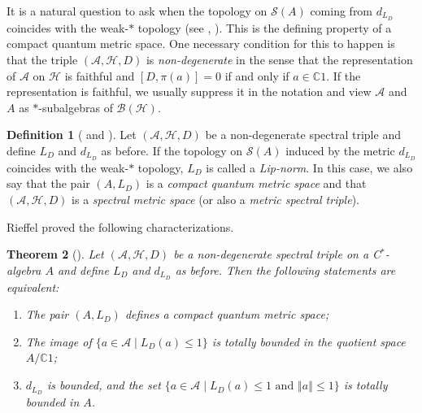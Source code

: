 \documentclass[a4paper,11pt,reqno]{amsart}
\numberwithin{equation}{section}
\numberwithin{equation}{section}
\newtheorem{theorem}{Theorem}[section]
\theoremstyle{definition}
\newtheorem{definition}[theorem]{Definition}
\theoremstyle{remark}
\theoremstyle{remark}
\begin{document}
It is a natural question to ask when the topology on $\mathcal{S}(A)$
coming from $d_{L_{D}}$ coincides with the weak-$\ast$ topology
(see \cite{Rieffel98}, \cite{Rieffel99}). This is the defining property
of a compact quantum metric space. One necessary condition for this to happen is that the triple $(\mathcal{A},\mathcal{H},D)$ is \emph{non-degenerate} in the sense that the representation of $\mathcal{A}$
on $\mathcal{H}$ is faithful and $[D,\pi(a)]=0$ if and only if $a\in\mathbb{C}1$.
If the representation is faithful, we usually suppress it in the notation
and view $\mathcal{A}$ and $A$ as $\ast$-subalgebras of $\mathcal{B}(\mathcal{H})$.

\begin{definition}[{\cite[Definition 5.1]{Rieffel99} and \cite[Definition 2.2]{Rieffel04}}] Let $(\mathcal{A},\mathcal{H},D)$
be a non-degenerate spectral triple and define $L_{D}$ and $d_{L_{D}}$
as before. If the topology on $\mathcal{S}(A)$ induced by the metric
$d_{L_{D}}$ coincides with the weak-$\ast$ topology, $L_{D}$ is
called a \emph{Lip-norm}. In this case, we also say that the pair $(A,L_{D})$
is a \emph{compact quantum metric space} and that $(\mathcal{A},\mathcal{H},D)$
is a \emph{spectral metric space} (or also a \emph{metric spectral triple}). \end{definition}

Rieffel proved the following characterizations.

\begin{theorem}[{\cite[Theorem 1.8]{Rieffel98}}] \label{Characterization}
Let $(\mathcal{A},\mathcal{H},D)$ be a non-degenerate spectral triple
on a C$^{\ast}$-algebra $A$ and define $L_{D}$ and $d_{L_D}$ as before. Then
the following statements are equivalent:
\begin{enumerate}
\item The pair $(A,L_{D})$ defines a compact quantum metric space;
\item The image of $\{a\in\mathcal{A}\mid L_{D}(a)\leq1\}$ is totally bounded
in the quotient space $A/\mathbb{C}1$;
\item $d_{L_D}$ is bounded, and the set $\{a\in\mathcal{A}\mid L_{D}(a)\leq1\text{ and }\left\Vert a\right\Vert \leq1\}$
is totally bounded in $A$.
\end{enumerate}
\end{theorem}

\vspace{3mm}

\end{document}
